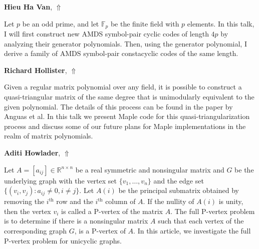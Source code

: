 \documentclass[ILAS2025-program.tex]{subfiles}
\begin{document}
\hypertarget{down0417}{}\begin{ilasabstract}
    
\textbf{Hieu Ha Van},  \hfill \hyperlink{up0417}{$\Uparrow$}
    
    
\mtskip
    Let $p$ be an odd prime, and let $\mathbb F_p$ be the finite field with $p$ elements. In this talk, I will first construct new AMDS symbol-pair cyclic codes of length $4p$ by analyzing their generator polynomials. Then, using the generator polynomial, I derive a family of AMDS symbol-pair constacyclic codes of the same length.
\end{ilasabstract}
    

\hypertarget{down0399}{}\begin{ilasabstract}
    
\textbf{Richard Hollister},  \hfill \hyperlink{up0399}{$\Uparrow$}
    
    
\mtskip
    Given a regular matrix polynomial over any field, it is possible to construct a quasi-triangular matrix of the same degree that is unimodularly equivalent to the given polynomial.  The details of this process can be found in the paper by Anguas et al.  In this talk we present Maple code for this quasi-triangularization process and discuss some of our future plans for Maple implementations in the realm of matrix polynomials.

\end{ilasabstract}
    

\hypertarget{down0092}{}\begin{ilasabstract}
    
\textbf{Aditi Howlader},  \hfill \hyperlink{up0092}{$\Uparrow$}
    
    
\mtskip
    Let $A=[a_{ij}] \in \mathbb{R}^{n \times n}$ be a real symmetric and nonsingular matrix and $G$ be the underlying graph with the vertex set $\{v_1,\ldots, v_n\}$ and the edge set $\{(v_i,v_j)\colon a_{ij}\neq 0, i\neq j\}$. Let $A(i)$ be the principal submatrix obtained by removing the $i^\text{th}$ row and the $i^\text{th}$ column of $A$. If the nullity of $A(i)$ is unity, then the vertex $v_i$ is called a P-vertex of the matrix $A$. The full P-vertex problem is to determine if there is a nonsingular matrix $A$ such that each vertex of the corresponding graph $G$, is a P-vertex of $A$. In this article, we investigate the full P-vertex problem for unicyclic graphs.
\end{ilasabstract}
    
\end{document}
